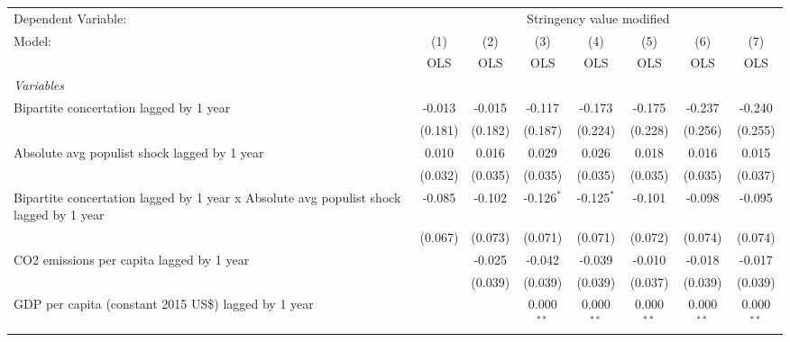 
\begingroup
\centering
\begin{tabular}{lccccccc}
   \toprule
   Dependent Variable: & \multicolumn{7}{c}{Stringency value modified}\\
   Model:                                                                                 & (1)     & (2)     & (3)          & (4)          & (5)          & (6)          & (7)\\  
                                                                                          &  OLS    & OLS     & OLS          & OLS          & OLS          & OLS          & OLS\\  
   \midrule
   \emph{Variables}\\
   Bipartite concertation lagged by 1 year                                                & -0.013  & -0.015  & -0.117       & -0.173       & -0.175       & -0.237       & -0.240\\   
                                                                                          & (0.181) & (0.182) & (0.187)      & (0.224)      & (0.228)      & (0.256)      & (0.255)\\   
   Absolute avg populist shock lagged by 1 year                                           & 0.010   & 0.016   & 0.029        & 0.026        & 0.018        & 0.016        & 0.015\\   
                                                                                          & (0.032) & (0.035) & (0.035)      & (0.035)      & (0.035)      & (0.035)      & (0.037)\\   
   Bipartite concertation lagged by 1 year x Absolute avg populist shock lagged by 1 year & -0.085  & -0.102  & -0.126$^{*}$ & -0.125$^{*}$ & -0.101       & -0.098       & -0.095\\   
                                                                                          & (0.067) & (0.073) & (0.071)      & (0.071)      & (0.072)      & (0.074)      & (0.074)\\   
   CO2 emissions per capita lagged by 1 year                                              &         & -0.025  & -0.042       & -0.039       & -0.010       & -0.018       & -0.017\\   
                                                                                          &         & (0.039) & (0.039)      & (0.039)      & (0.037)      & (0.039)      & (0.039)\\   
   GDP per capita (constant 2015 US\$) lagged by 1 year                                   &         &         & 0.000$^{**}$ & 0.000$^{**}$ & 0.000$^{**}$ & 0.000$^{**}$ & 0.000$^{**}$\\   

\end{tabular}
